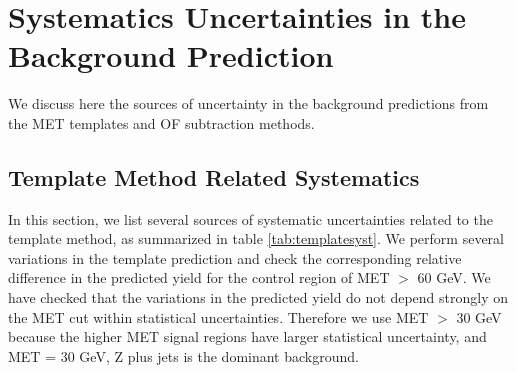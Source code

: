 \section{Systematics Uncertainties in the Background Prediction}
\label{sec:systematics}

We discuss here the sources of uncertainty in the background predictions from 
the MET templates and OF subtraction methods.

\subsection{Template Method Related Systematics}
\label{sec:systematicstemp}
In this section, we list several sources of systematic uncertainties related to the template method,
as summarized in table \ref{tab:templatesyst}. We perform several variations in the 
template prediction
and check the corresponding relative difference in the predicted yield for the 
control region of MET $>$ 60 GeV.
We have checked that the variations in the predicted yield do not depend strongly on the MET cut
within statistical uncertainties. 
Therefore we use MET $>$ 30 GeV because the 
higher MET signal regions have
larger statistical uncertainty,
and MET = 30 GeV, Z plus jets is the dominant background.

